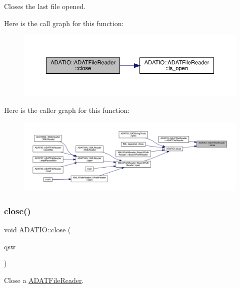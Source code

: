 Closes the last file opened. 

Here is the call graph for this function\+:\nopagebreak
\begin{figure}[H]
\begin{center}
\leavevmode
\includegraphics[width=350pt]{db/de5/group__qio_ga8b86dba1600272d26539815146f04078_cgraph}
\end{center}
\end{figure}
Here is the caller graph for this function\+:
\nopagebreak
\begin{figure}[H]
\begin{center}
\leavevmode
\includegraphics[width=350pt]{db/de5/group__qio_ga8b86dba1600272d26539815146f04078_icgraph}
\end{center}
\end{figure}
\mbox{\label{group__qio_gac32c771b58d87e4ef4af62a7ad2e5c0d}} 
\subsubsection{\texorpdfstring{close()}{close()}\hspace{0.1cm}{\footnotesize\ttfamily [2/2]}}
{\footnotesize\ttfamily void A\+D\+A\+T\+I\+O\+::close (\begin{DoxyParamCaption}\item[{\mbox{\hyperlink{classADATIO_1_1ADATFileReader}{A\+D\+A\+T\+File\+Reader}} \&}]{qsw }\end{DoxyParamCaption})}



Close a \mbox{\hyperlink{classADATIO_1_1ADATFileReader}{A\+D\+A\+T\+File\+Reader}}. 

